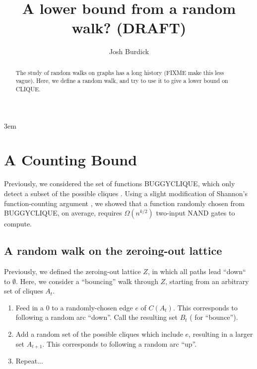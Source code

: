 \documentclass[12pt]{article}
\theoremstyle{definition}
\begin{document}
\emergencystretch 3em
\title{A lower bound from a random walk? (DRAFT)}

\author{Josh Burdick}

\maketitle

\begin{abstract}
The study of random walks on graphs has a long history (FIXME make this less vague).
Here, we define a random walk, and try to use it to
give a lower bound on CLIQUE.
\end{abstract}

\newpage

\tableofcontents

\vspace{5mm}


\section{A Counting Bound} \label{se:countingBound}

Previously, we considered the set of functions BUGGYCLIQUE, which
only detect a subset of the possible cliques \cite{buggyclique}.
Using a slight modification of Shannon's
function-counting argument \cite{shannon_synthesis_1949},
we showed that a function randomly chosen from BUGGYCLIQUE,
on average, requires $\Omega(n^{k/2})$ two-input NAND gates to compute.

\subsection{A random walk on the zeroing-out lattice}

Previously, we defined the zeroing-out lattice $Z$, in which all paths lead
``down`` to $\emptyset$. Here, we consider a ``bouncing'' walk
through $Z$, starting from an arbitrary set of cliques $A_t$.

\begin{enumerate}

\item Feed in a 0 to a randomly-chosen edge $e$ of $C(A_t)$. 
This corresponds to
following a random arc ``down''. Call the resulting set $B_t$ (
for ``bounce'').

\item Add a random set of the possible cliques which include $e$,
resulting in a larger set $A_{t+1}$. This corresponds to following
a random arc ``up''.

\item Repeat...

\end{enumerate}
\end{document}

